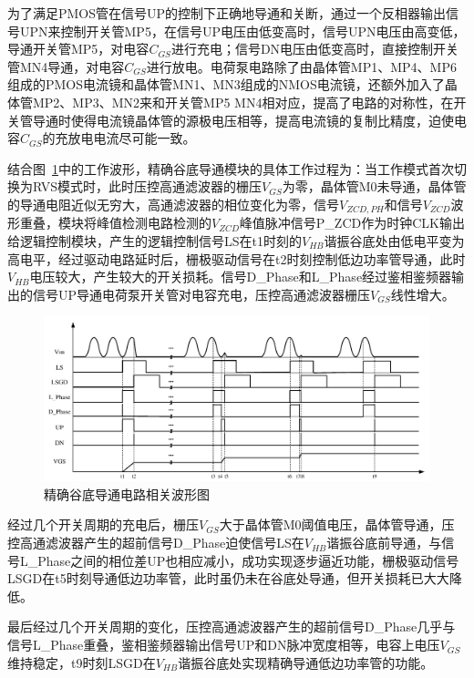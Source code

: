 为了满足PMOS管在信号UP的控制下正确地导通和关断，通过一个反相器输出信号UPN来控制开关管MP5，在信号UP电压由低变高时，信号UPN电压由高变低，导通开关管MP5，对电容$C_{GS}$进行充电；信号DN电压由低变高时，直接控制开关管MN4导通，对电容$C_{GS}$进行放电。电荷泵电路除了由晶体管MP1、MP4、MP6组成的PMOS电流镜和晶体管MN1、MN3组成的NMOS电流镜，还额外加入了晶体管MP2、MP3、MN2来和开关管MP5 MN4相对应，提高了电路的对称性，在开关管导通时使得电流镜晶体管的源极电压相等，提高电流镜的复制比精度，迫使电容$C_{GS}$的充放电电流尽可能一致。


结合图~\ref{fig:精确谷底导通波形图}中的工作波形，精确谷底导通模块的具体工作过程为：当工作模式首次切换为RVS模式时，此时压控高通滤波器的栅压$V_{GS}$为零，晶体管M0未导通，晶体管的导通电阻近似无穷大，高通滤波器的相位变化为零，信号$V_{ZCD,PH}$和信号$V_{ZCD}$波形重叠，模块将峰值检测电路检测的$V_{ZCD}$峰值脉冲信号P\_ZCD作为时钟CLK输出给逻辑控制模块，产生的逻辑控制信号LS在t1时刻的$V_{HB}$谐振谷底处由低电平变为高电平，经过驱动电路延时后，栅极驱动信号在t2时刻控制低边功率管导通，此时$V_{HB}$电压较大，产生较大的开关损耗。信号D\_Phase和L\_Phase经过鉴相鉴频器输出的信号UP导通电荷泵开关管对电容充电，压控高通滤波器栅压$V_{GS}$线性增大。

\begin{figure}[htbp] 
    \centering
    \includegraphics[width=1.0\linewidth]{figures/精确谷底导通波形图.pdf}
    \caption{精确谷底导通电路相关波形图}
    \label{fig:精确谷底导通波形图}
\end{figure} 

经过几个开关周期的充电后，栅压$V_{GS}$大于晶体管M0阈值电压，晶体管导通，压控高通滤波器产生的超前信号D\_Phase迫使信号LS在$V_{HB}$谐振谷底前导通，与信号L\_Phase之间的相位差UP也相应减小，成功实现逐步逼近功能，栅极驱动信号LSGD在t5时刻导通低边功率管，此时虽仍未在谷底处导通，但开关损耗已大大降低。

最后经过几个开关周期的变化，压控高通滤波器产生的超前信号D\_Phase几乎与信号L\_Phase重叠，鉴相鉴频器输出信号UP和DN脉冲宽度相等，电容上电压$V_{GS}$维持稳定，t9时刻LSGD在$V_{HB}$谐振谷底处实现精确导通低边功率管的功能。


